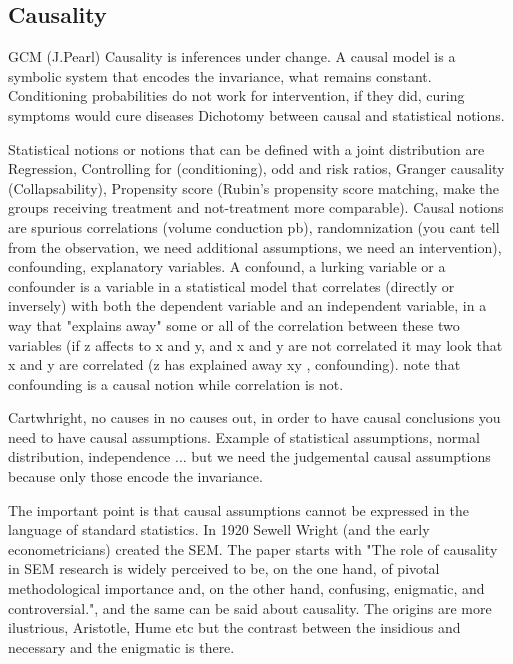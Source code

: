 \documentclass[onecollarge,runningheads]{svjour2}
\begin{document}
\subsection{Causality}
GCM (J.Pearl) Causality is inferences under change. A causal model is a symbolic system that encodes the invariance, what remains constant.
Conditioning probabilities do not work for intervention, if they did, curing symptoms would cure diseases
Dichotomy between causal and statistical notions.

Statistical notions or notions that can be defined with a joint distribution are Regression, Controlling for (conditioning), odd and risk ratios, Granger causality (Collapsability), Propensity score (Rubin's propensity score matching, make the groups receiving treatment and not-treatment more comparable).
Causal notions are spurious correlations (volume conduction pb), randomnization (you cant tell from the observation, we need additional assumptions, we need an intervention), confounding, explanatory variables.
A confound, a lurking variable or a confounder is a variable in a statistical model that correlates (directly or inversely) with both the dependent variable and an independent variable,  in a way that "explains away" some or all of the correlation between these two variables (if z affects to x and y, and x and y are not correlated it may look that x and y are correlated (z has explained away xy , confounding). note that confounding is a causal notion while correlation is not.

Cartwhright, no causes in no causes out, in order to have causal conclusions you need to have causal assumptions. Example of statistical assumptions, normal distribution, independence ... but we need the judgemental causal assumptions because only those encode the invariance.

The important point is that causal assumptions cannot be expressed in the language of standard statistics. In 1920 Sewell Wright (and the early econometricians) created the SEM.
The paper starts with "The role of causality in SEM research is widely perceived to be, on the one hand, of pivotal methodological importance and, on the other hand, confusing, enigmatic, and controversial.", and the same can be said about causality. The origins are more ilustrious, Aristotle, Hume etc but the contrast between the insidious and necessary and the enigmatic is there. 
\end{document}
